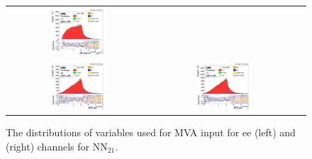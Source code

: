 \begin{figure}[ht]
\begin{center}
\begin{tabular}{ccc}
      \includegraphics[width=0.4\textwidth]{figures/tW/fig/MVA_input/mumu/H_2j1b_dR_l1_j2.png}\\
      \includegraphics[width=0.4\textwidth]{figures/tW/fig/MVA_input/ee/H_2j1b_dR_ll_j1.png}&
      \includegraphics[width=0.4\textwidth]{figures/tW/fig/MVA_input/mumu/H_2j1b_dR_ll_j1.png}\\
    \end{tabular}
    \caption{The distributions of variables used for MVA input for ee (left) and \mumu (right) channels for NN$_{21}$.
    \label{fig:MVA_2j1t_1}}
  \end{center}
\end{figure}

